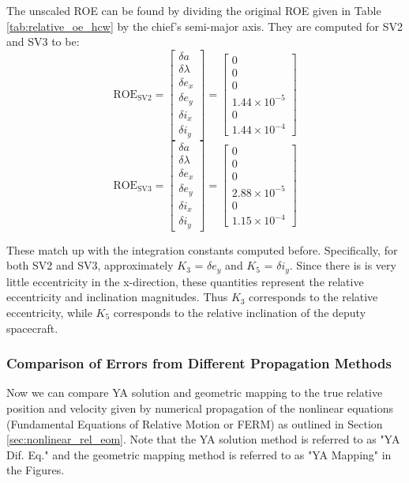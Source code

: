 The unscaled ROE can be found by dividing the original ROE given in Table \ref{tab:relative_oe_hcw} by the chief's semi-major axis. They are computed for SV2 and SV3 to be:
\[
\text{ROE}_{\text{SV2}} = 
\begin{bmatrix}
\delta a \\ \delta \lambda \\ \delta e_x \\ \delta e_y \\ \delta i_x \\ \delta i_y
\end{bmatrix} =
\begin{bmatrix}
0 \\
0 \\
0 \\
1.44 \times 10^{-5} \\
0 \\
1.44\times 10^{-4}
\end{bmatrix}
\]
\[
\text{ROE}_{\text{SV3}} = 
\begin{bmatrix}
\delta a \\ \delta \lambda \\ \delta e_x \\ \delta e_y \\ \delta i_x \\ \delta i_y
\end{bmatrix} =
\begin{bmatrix}
0 \\
0 \\
0 \\
2.88 \times 10^{-5} \\
0 \\
1.15\times 10^{-4}
\end{bmatrix}
\]

These match up with the integration constants computed before. Specifically, for both SV2 and SV3, approximately $K_3$ = $\delta e_y$ and $K_5$ = $\delta i_y$. Since there is is very little eccentricity in the x-direction, these quantities represent the relative eccentricity and inclination magnitudes. Thus $K_3$ corresponds to the relative eccentricity, while $K_5$ corresponds to the relative inclination of the deputy spacecraft. 


\subsubsection{Comparison of Errors from Different Propagation Methods}
Now we can compare YA solution and geometric mapping to the true relative position and velocity given by numerical propagation of the nonlinear equations (Fundamental Equations of Relative Motion or FERM) as outlined in Section \ref{sec:nonlinear_rel_eom}. Note that the YA solution method is referred to as "YA Dif. Eq." and the geometric mapping method is referred to as "YA Mapping" in the Figures. 

